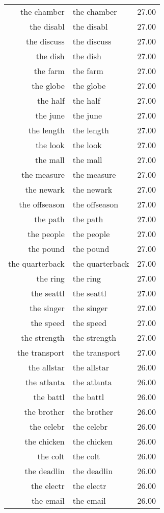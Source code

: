 \begin{table}[ht]
\begin{tabular}{rlr}
  the chamber & the chamber & 27.00 \\ 
  the disabl & the disabl & 27.00 \\ 
  the discuss & the discuss & 27.00 \\ 
  the dish & the dish & 27.00 \\ 
  the farm & the farm & 27.00 \\ 
  the globe & the globe & 27.00 \\ 
  the half & the half & 27.00 \\ 
  the june & the june & 27.00 \\ 
  the length & the length & 27.00 \\ 
  the look & the look & 27.00 \\ 
  the mall & the mall & 27.00 \\ 
  the measure & the measure & 27.00 \\ 
  the newark & the newark & 27.00 \\ 
  the offseason & the offseason & 27.00 \\ 
  the path & the path & 27.00 \\ 
  the people & the people & 27.00 \\ 
  the pound & the pound & 27.00 \\ 
  the quarterback & the quarterback & 27.00 \\ 
  the ring & the ring & 27.00 \\ 
  the seattl & the seattl & 27.00 \\ 
  the singer & the singer & 27.00 \\ 
  the speed & the speed & 27.00 \\ 
  the strength & the strength & 27.00 \\ 
  the transport & the transport & 27.00 \\ 
  the allstar & the allstar & 26.00 \\ 
  the atlanta & the atlanta & 26.00 \\ 
  the battl & the battl & 26.00 \\ 
  the brother & the brother & 26.00 \\ 
  the celebr & the celebr & 26.00 \\ 
  the chicken & the chicken & 26.00 \\ 
  the colt & the colt & 26.00 \\ 
  the deadlin & the deadlin & 26.00 \\ 
  the electr & the electr & 26.00 \\ 
  the email & the email & 26.00 \\ 

\end{tabular}
\end{table}
